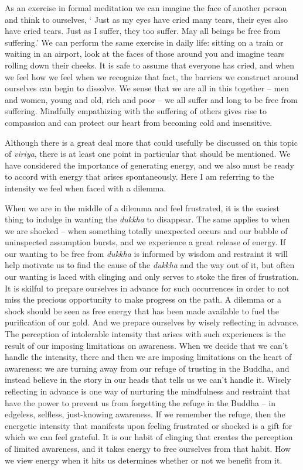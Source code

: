 As an exercise in formal meditation we can imagine the face of another
person and think to ourselves, ` Just as my eyes have cried many tears,
their eyes also have cried tears. Just as I suffer, they too suffer. May
all beings be free from suffering.' We can perform the same exercise in
daily life: sitting on a train or waiting in an airport, look at the
faces of those around you and imagine tears rolling down their cheeks.
It is safe to assume that everyone has cried, and when we feel how we
feel when we recognize that fact, the barriers we construct around
ourselves can begin to dissolve. We sense that we are all in this
together -- men and women, young and old, rich and poor -- we all suffer
and long to be free from suffering. Mindfully empathizing with the
suffering of others gives rise to compassion and can protect our heart
from becoming cold and insensitive.

Although there is a great deal more that could usefully be discussed on
this topic of \emph{viriya}, there is at least one point in particular
that should be mentioned. We have considered the importance of
generating energy, and we also must be ready to accord with energy that
arises spontaneously. Here I am referring to the intensity we feel when
faced with a dilemma.

When we are in the middle of a dilemma and feel frustrated, it is the
easiest thing to indulge in wanting the \emph{dukkha} to disappear. The
same applies to when we are shocked -- when something totally unexpected
occurs and our bubble of uninspected assumption bursts, and we
experience a great release of energy. If our wanting to be free from
\emph{dukkha} is informed by wisdom and restraint it will help motivate
us to find the cause of the \emph{dukkha} and the way out of it, but
often our wanting is laced with clinging and only serves to stoke the
fires of frustration. It is skilful to prepare ourselves in advance for
such occurrences in order to not miss the precious opportunity to make
progress on the path. A dilemma or a shock should be seen as free energy
that has been made available to fuel the purification of our gold. And
we prepare ourselves by wisely reflecting in advance. The perception of
intolerable intensity that arises with such experiences is the result of our
imposing limitations on awareness. When we decide that we can't handle
the intensity, there and then we are imposing limitations on the heart
of awareness: we are turning away from our refuge of trusting in the
Buddha, and instead believe in the story in our heads that tells us we
can't handle it. Wisely reflecting in advance is one way of nurturing
the mindfulness and restraint that have the power to prevent us from
forgetting the refuge in the Buddha -- in edgeless, selfless,
just-knowing awareness. If we remember the refuge, then the energetic
intensity that manifests upon feeling frustrated or shocked is a gift
for which we can feel grateful. It is our habit of clinging that creates
the perception of limited awareness, and it takes energy to free
ourselves from that habit. How we view energy when it hits us determines
whether or not we benefit from it.

